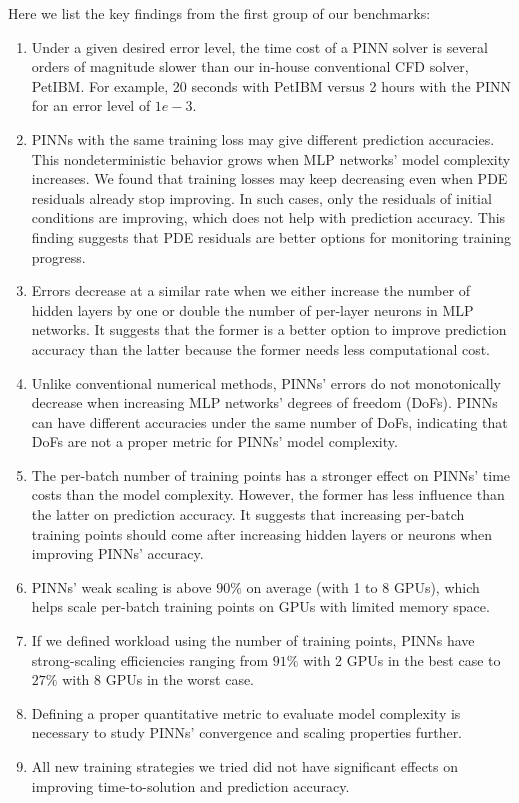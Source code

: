 {Here we list the key findings from the first group of our benchmarks:
\begin{enumerate}[nolistsep]
    \item Under a given desired error level, the time cost of a PINN solver is several orders of magnitude slower than our in-house conventional CFD solver, PetIBM.
    For example, 20 seconds with PetIBM versus 2 hours with the PINN for an error level of $1e-3$.
    \item PINNs with the same training loss may give different prediction accuracies.
    This nondeterministic behavior grows when MLP networks' model complexity increases.
    We found that training losses may keep decreasing even when PDE residuals already stop improving.
    In such cases, only the residuals of initial conditions are improving, which does not help with prediction accuracy.
    This finding suggests that PDE residuals are better options for monitoring training progress.
    \item Errors decrease at a similar rate when we either increase the number of hidden layers by one or double the number of per-layer neurons in MLP networks.
    It suggests that the former is a better option to improve prediction accuracy than the latter because the former needs less computational cost.
    \item Unlike conventional numerical methods, PINNs' errors do not monotonically decrease when increasing MLP networks' degrees of freedom (DoFs).
    PINNs can have different accuracies under the same number of DoFs, indicating that DoFs are not a proper metric for PINNs' model complexity.
    \item The per-batch number of training points has a stronger effect on PINNs' time costs than the model complexity. However, the former has less influence than the latter on prediction accuracy.
    It suggests that increasing per-batch training points should come after increasing hidden layers or neurons when improving PINNs' accuracy.
    \item PINNs' weak scaling is above $90\%$ on average (with 1 to 8 GPUs), which helps scale per-batch training points on GPUs with limited memory space.
    \item If we defined workload using the number of training points, PINNs have strong-scaling efficiencies ranging from $91\%$ with 2 GPUs in the best case to $27\%$ with 8 GPUs in the worst case.
    \item Defining a proper quantitative metric to evaluate model complexity is necessary to study PINNs' convergence and scaling properties further.
    \item All new training strategies we tried did not have significant effects on improving time-to-solution and prediction accuracy.
\end{enumerate}

}
